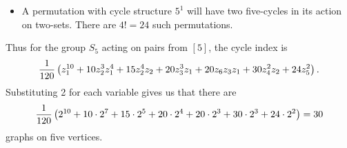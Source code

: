 {\begin{itemize}
and one two-cycle of two-subsets from its own four-cycle and another four cycle of
pairs of members of the four-cycle and one cycle. thus it has two four-cycles and
two one-cycles There are
$6{5\choose4}=30$ such permutations.
\item A permutation with cycle structure $5^1$ will have two five-cycles in its action on
two-sets.  There are $4!=24$ such permutations.
\end{itemize}
Thus for the group $S_5$ acting on pairs from $[5]$, the cycle index is
$${1\over120}\left(z_1^{10}+10z_2^3z_1^4+15z_2^4z_2+20z_3^3z_1+20z_6z_3z_1+
30z_4^2z_2+ 24z_5^2\right).$$  Substituting 2 for each variable gives us that there
are 
$${1\over120}\left(2^{10}+10\cdot2^7+15\cdot2^5+20\cdot2^4+20\cdot2^3+30\cdot2^3+
24\cdot2^2\right)=30$$ graphs on five vertices.}
\ep


